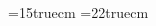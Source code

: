 \textwidth=15truecm
\textheight=22truecm


\setcounter{page}{0}

\tableofcontents  
{}




\begin{thebibliography}{10}      %

\end{thebibliography}             %


\endinput
